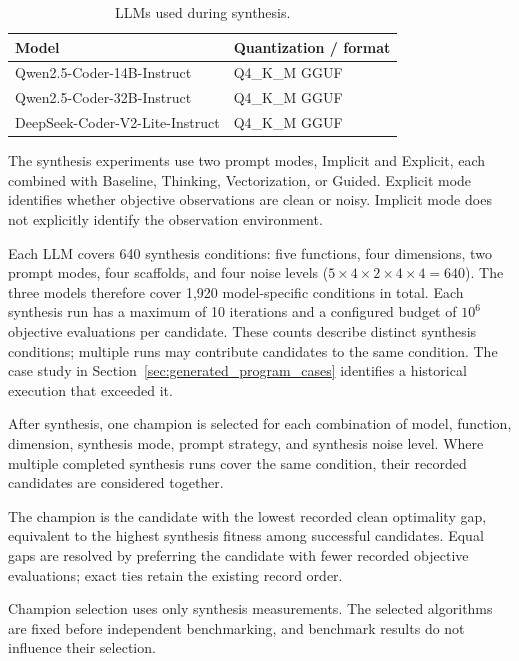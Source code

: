 \begin{table}[htbp]
    \centering
    \caption{LLMs used during synthesis.}
    \label{tab:llm_configurations}
    \begin{tabularx}{\textwidth}{>{\raggedright\arraybackslash}X l}
        \hline
        Model & Quantization / format \\
        \hline
        Qwen2.5-Coder-14B-Instruct & Q4\_K\_M GGUF \\
        Qwen2.5-Coder-32B-Instruct & Q4\_K\_M GGUF \\
        DeepSeek-Coder-V2-Lite-Instruct & Q4\_K\_M GGUF \\
        \hline
    \end{tabularx}
\end{table}

The synthesis experiments use two prompt modes, Implicit and Explicit,
each combined with Baseline, Thinking, Vectorization, or Guided. Explicit
mode identifies whether objective observations are clean or noisy.
Implicit mode does not explicitly identify the observation environment.

Each LLM covers 640 synthesis conditions: five functions, four dimensions,
two prompt modes, four scaffolds, and four noise levels
($5\times4\times2\times4\times4=640$). The three models therefore cover
1,920 model-specific conditions in total. Each synthesis run has a maximum
of 10 iterations and a configured budget of $10^6$ objective evaluations
per candidate. These counts describe distinct synthesis conditions;
multiple runs may contribute candidates to the same condition.
The case study in
Section~\ref{sec:generated_program_cases} identifies a historical
execution that exceeded it.

After synthesis, one champion is selected for each combination of model,
function, dimension, synthesis mode, prompt strategy, and synthesis noise
level. Where multiple completed synthesis runs cover the same condition,
their recorded candidates are considered together.

The champion is the candidate with the lowest recorded clean optimality
gap, equivalent to the highest synthesis fitness among successful
candidates. Equal gaps are resolved by preferring the candidate with fewer
recorded objective evaluations; exact ties retain the existing record
order.

Champion selection uses only synthesis measurements. The selected
algorithms are fixed before independent benchmarking, and benchmark
results do not influence their selection.

